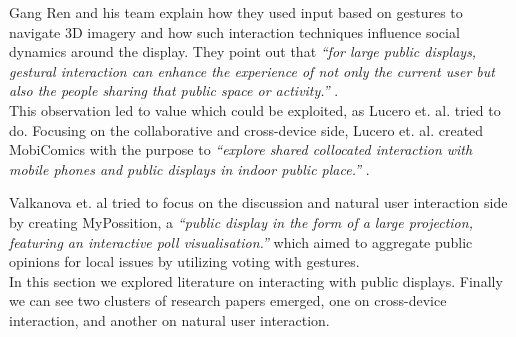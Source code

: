 Gang Ren and his team explain how they used input based on gestures to navigate 3D imagery and how such interaction techniques influence social dynamics around the display. 
They point out that\emph{ ``for large public displays, gestural interaction can enhance the experience of not only the current user but also the people sharing that public space or activity.''} \cite{Ren:2013}.\\

This observation led to value which could be exploited, as Lucero et. al. tried to do. 
Focusing on the collaborative and cross-device side, Lucero et. al. created MobiComics with the purpose to \emph{``explore shared collocated interaction with mobile phones and public displays in indoor public place.''} \cite{Lucero:2012}. 

Valkanova et. al tried to focus on the discussion and natural user interaction side by creating MyPossition, a \emph{``public display in the form of a large projection, featuring an interactive poll visualisation.''} \cite{Valkanova:2014} which aimed to aggregate public opinions for local issues by utilizing voting with gestures.\\

In this section we explored literature on interacting with public displays. 
Finally we can see two clusters of research papers emerged, one on cross-device interaction, and another on natural user interaction.

